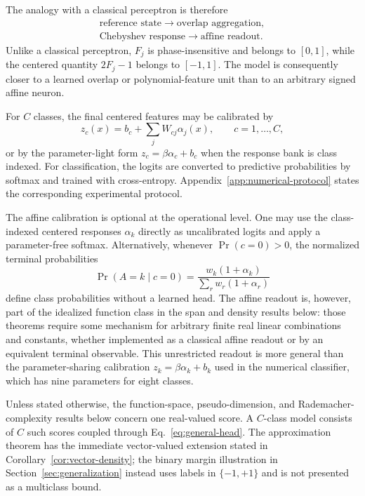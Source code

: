 \documentclass[pdflatex,sn-mathphys,NameDate,iicol]{sn-jnl}
\begin{document}
The analogy with a classical perceptron is therefore
\[
\begin{gathered}
\text{reference state}\longrightarrow\text{overlap aggregation},\\
\text{Chebyshev response}\longrightarrow\text{affine readout}.
\end{gathered}
\]
Unlike a classical perceptron, $F_j$ is phase-insensitive and belongs to
$[0,1]$, while the centered quantity $2F_j-1$ belongs to $[-1,1]$.
The model is consequently closer to a learned overlap or polynomial-feature
unit than to an arbitrary signed affine neuron.

For $C$ classes, the final centered features may be calibrated by
\begin{equation}
  z_c(x)=b_c+\sum_j W_{cj}\alpha_j(x),
  \qquad c=1,\ldots,C,
  \label{eq:general-head}
\end{equation}
or by the parameter-light form $z_c=\beta\alpha_c+b_c$ when the response bank
is class indexed. For classification, the logits are converted to predictive
probabilities by softmax and trained with cross-entropy.
Appendix~\ref{app:numerical-protocol} states the corresponding experimental
protocol.

The affine calibration is optional at the operational level. One may use the
class-indexed centered responses $\alpha_k$ directly as uncalibrated logits
and apply a parameter-free softmax. Alternatively, whenever
$\Pr(c=0)>0$, the normalized terminal probabilities
\begin{equation*}
 \Pr(A=k\mid c=0)
 =
 \frac{w_k(1+\alpha_k)}{\sum_r w_r(1+\alpha_r)}
\end{equation*}
define class probabilities without a learned head. The affine readout is,
however, part of the idealized function class in the span and density results
below: those theorems require some mechanism for arbitrary finite real linear
combinations and constants, whether implemented as a classical affine readout
or by an equivalent terminal observable. This unrestricted readout is more
general than the parameter-sharing calibration
$z_k=\beta\alpha_k+b_k$ used in the numerical classifier, which has nine
parameters for eight classes.

Unless stated otherwise, the function-space, pseudo-dimension, and
Rademacher-complexity results below concern one real-valued score. A
$C$-class model consists of $C$ such scores coupled through
Eq.~\eqref{eq:general-head}. The approximation theorem has the immediate
vector-valued extension stated in Corollary~\ref{cor:vector-density}; the
binary margin illustration in Section~\ref{sec:generalization} instead uses
labels in $\{-1,+1\}$ and is not presented as a multiclass bound.
\end{document}
